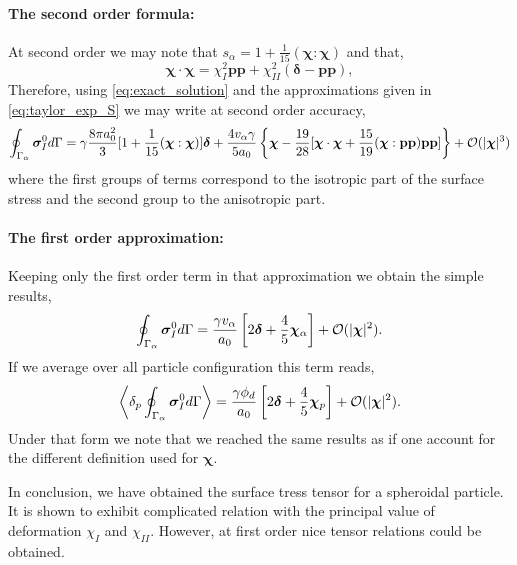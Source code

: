 \paragraph{The second order formula: }
At second order we may note that $s_\alpha =  1 + \frac{1}{15}(\bm\chi:\bm\chi)$ and that,
\begin{equation*}
    \bm\chi\cdot\bm\chi
    = 
    \chi_I^2 \textbf{pp}
    + 
    \chi_{II}^2 (\bm\delta - \textbf{pp}),
\end{equation*}
Therefore, using \ref{eq:exact_solution} and the approximations given in \ref{eq:taylor_exp_S} we may write at second order accuracy, 
\begin{align}
    \intS{\bm\sigma_I^0}
    = 
    \gamma \frac{8\pi a_0^2}{3} [
        1
        +
        \frac{1}{15}
        (\bm\chi:\bm\chi)
    ] 
    \bm\delta  
    + 
    \frac{4 v_\alpha \gamma}{5 a_0} \left\{
        \bm\chi
        - \frac{19}{28} [\bm\chi \cdot \bm\chi
        + \frac{15}{19}(\bm\chi:\textbf{pp})\textbf{pp}]
    \right\}
    +\mathcal{O}(|\bm\chi|^3)
    \label{eq:app2_formula}
\end{align}
where the first groups of terms correspond to the isotropic part of the surface stress and the second group to the anisotropic part. 


\paragraph*{The first order approximation:}
Keeping only the first order term in that approximation we obtain the simple results,
\begin{align}
    \intS{\bm\sigma_I^0}
    = 
    \frac{\gamma v_\alpha }{a_0} \left[
        2\bm\delta  
        + 
        \frac{4}{5} 
        \bm\chi_\alpha
        \right]
    +\mathcal{O}(|\bm\chi|^2).
    \label{eq:app1_formula}
\end{align}
If we average over all particle configuration this term reads, 
\begin{align}
    \left<\delta_p \oint_{\Gamma_{\alpha}} \bm\sigma_I^0 d\Gamma\right>
    = 
    \frac{\gamma \phi_d }{a_0} \left[
        2\bm\delta  
        + 
        \frac{4}{5} 
        \bm\chi_p
        \right]
    +\mathcal{O}(|\bm\chi|^2).
\end{align}
Under that form we note that we reached the same results as \citet{lhuillier1987phenomenology} if one account for the different definition used for $\bm\chi$. 


In conclusion, we have obtained the surface tress tensor for a spheroidal particle. 
It is shown to exhibit complicated relation with the principal value of deformation $\chi_I$ and $\chi_{II}$.
However, at first order nice tensor relations could be obtained. 


